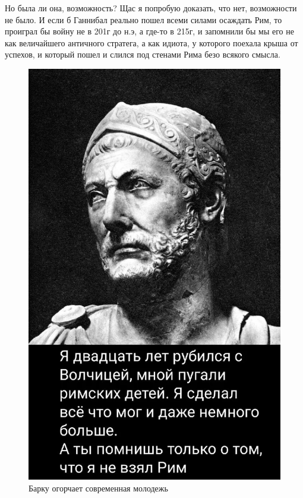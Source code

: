 Но была ли она, возможность? Щас я попробую доказать, что нет, возможности не было. И если б Ганнибал реально пошел всеми силами осаждать Рим, то проиграл бы войну не в 201г до н.э, а где-то в 215г, и запомнили бы мы его не как величайшего античного стратега, а как идиота, у которого поехала крыша от успехов, и который пошел и слился под стенами Рима безо всякого смысла.
\begin{figure}[h!tb]
	\centering\includegraphics[scale=0.3]{Data/Hannibal_and_Rome/1622873064131436757.jpg}
	\caption{Барку огорчает современная молодежь	}
	\label{fig:barka1} %
\end{figure}

